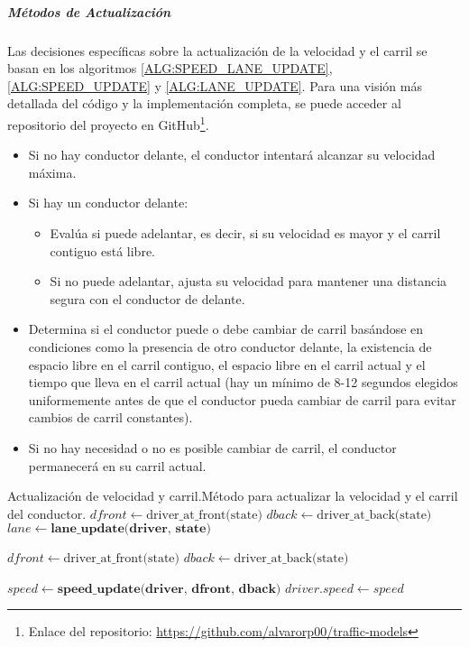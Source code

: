 \subparagraph{Métodos de Actualización}

Las decisiones específicas sobre la actualización de la velocidad y el carril se basan en los algoritmos \ref{ALG:SPEED_LANE_UPDATE}, \ref{ALG:SPEED_UPDATE} y \ref{ALG:LANE_UPDATE}.
Para una visión más detallada del código y la implementación completa, se puede acceder al repositorio del proyecto en GitHub\footnote{Enlace del repositorio: \url{https://github.com/alvarorp00/traffic-models}}.

\begin{itemize}
    \item Si no hay conductor delante, el conductor intentará alcanzar su velocidad máxima.
    \item Si hay un conductor delante:
    \begin{itemize}
        \item Evalúa si puede adelantar, es decir, si su velocidad es mayor y el carril contiguo está libre.
        \item Si no puede adelantar, ajusta su velocidad para mantener una distancia segura con el conductor de delante.
    \end{itemize}
\end{itemize}

\begin{itemize}
    \item Determina si el conductor puede o debe cambiar de carril basándose en condiciones como la presencia de otro conductor delante,
    la existencia de espacio libre en el carril contiguo, el espacio libre en el carril actual y el tiempo que lleva en el carril actual
    (hay un mínimo de 8-12 segundos elegidos uniformemente antes de que el conductor pueda cambiar de carril para evitar cambios de carril constantes).
    \item Si no hay necesidad o no es posible cambiar de carril, el conductor permanecerá en su carril actual.
\end{itemize}


\begin{algorithmN}{Actualización de velocidad y carril.}{Método para actualizar la velocidad y el carril del conductor.}
    $dfront \leftarrow \text{driver\_at\_front(state)}$\;
    $dback \leftarrow \text{driver\_at\_back(state)}$\;
    $lane \leftarrow \textbf{lane\_update(driver, state)}$\;

     {
        $dfront \leftarrow \text{driver\_at\_front(state)}$\;
        $dback \leftarrow \text{driver\_at\_back(state)}$\;
    }

    $speed \leftarrow \textbf{speed\_update(driver, dfront, dback)}$\;
    $driver.speed \leftarrow speed$\;
    \;
\end{algorithmN}

